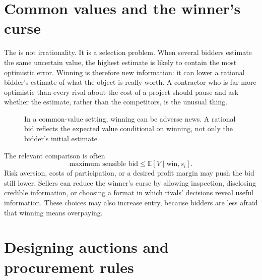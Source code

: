\section{Common values and the winner's curse}

The  is not irrationality. It is a selection problem.
When several bidders estimate the same uncertain value, the highest estimate
is likely to contain the most optimistic error. Winning is therefore new
information: it can lower a rational bidder's estimate of what the object is
really worth. A contractor who is far more optimistic than every rival about
the cost of a project should pause and ask whether the estimate, rather than
the competitors, is the unusual thing.

\begin{figure}[htbp]
  \centering
  \caption{In a common-value setting, winning can be adverse news. A rational
  bid reflects the expected value conditional on winning, not only the
  bidder's initial estimate.}
  \label{fig:winners-curse}
\end{figure}
\FloatBarrier

The relevant comparison is often
\[
\text{maximum sensible bid}
\leq
\mathbb{E}[V\mid \text{win},s_i].
\]
Risk aversion, costs of participation, or a desired profit margin may push the
bid still lower. Sellers can reduce the winner's curse by allowing inspection,
disclosing credible information, or choosing a format in which rivals'
decisions reveal useful information. These choices may also increase entry,
because bidders are less afraid that winning means overpaying.

\section{Designing auctions and procurement rules}

